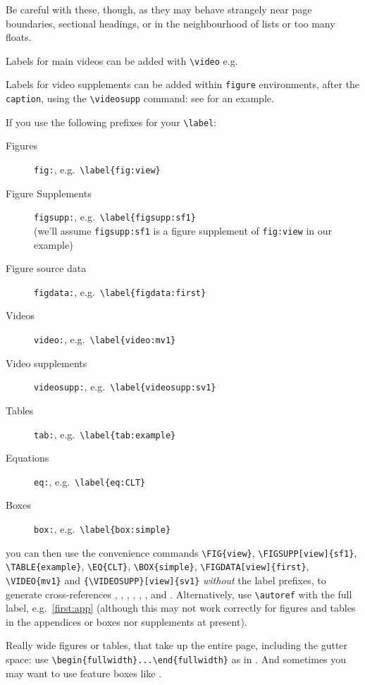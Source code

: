 \documentclass[9pt,lineno]{elife}
\begin{document}
Be careful with these, though, as they may behave strangely near page boundaries, sectional headings, or in the neighbourhood of lists or too many floats.

Labels for main videos can be added with \verb|\video| e.g.

\label{video:mv1}

Labels for video supplements can be added within \texttt{figure} environments, after the \texttt{caption}, using the \verb|\videosupp| command: see  for an example.

If you use the following prefixes for your \verb|\label|:
%
\begin{description}
\item[Figures] \texttt{fig:}, e.g.~\verb|\label{fig:view}|
\item[Figure Supplements] \texttt{figsupp:}, e.g.~\verb|\label{figsupp:sf1}|\\
(we'll assume \texttt{figsupp:sf1} is a figure supplement of \texttt{fig:view} in our example)
\item[Figure source data] \texttt{figdata:}, e.g.~\verb|\label{figdata:first}|
\item[Videos] \texttt{video:}, e.g.~\verb|\label{video:mv1}|
\item[Video supplements] \texttt{videosupp:}, e.g.~\verb|\label{videosupp:sv1}|
\item[Tables] \texttt{tab:}, e.g.~\verb|\label{tab:example}|
\item[Equations] \texttt{eq:}, e.g.~\verb|\label{eq:CLT}|
\item[Boxes] \texttt{box:}, e.g.~\verb|\label{box:simple}|
\end{description}
%
you can then use the convenience commands \verb|\FIG{view}|, \verb|\FIGSUPP[view]{sf1}|, \verb|\TABLE{example}|, \verb|\EQ{CLT}|, \verb|\BOX{simple}|, \verb|\FIGDATA[view]{first}|, \verb|\VIDEO{mv1}| and \verb|{\VIDEOSUPP}[view]{sv1}| \emph{without} the label prefixes, to generate cross-references , ,  , , , ,  and . Alternatively, use \verb|\autoref| with the full label, e.g.~\autoref{first:app} (although this may not work correctly for figures and tables in the appendices or boxes nor supplements at present).

Really wide figures or tables, that take up the entire page, including the gutter space: use \verb|\begin{fullwidth}...\end{fullwidth}| as in . And sometimes you may want to use feature boxes like .
\end{document}
